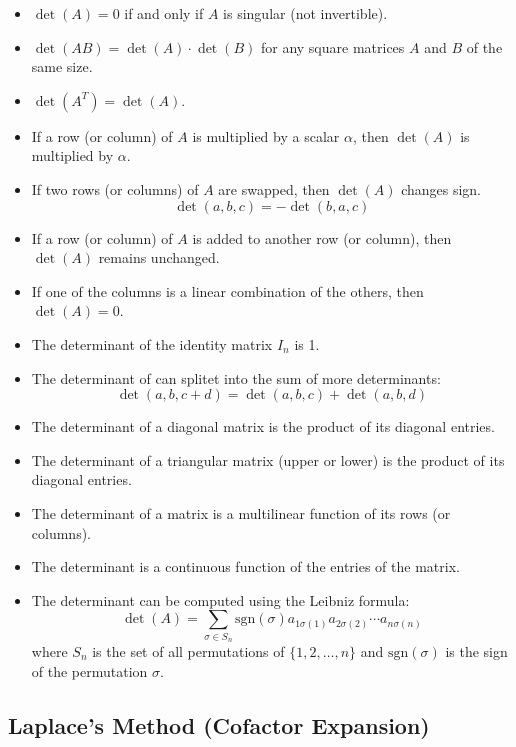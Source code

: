 \begin{itemize}[label=$-$]
    \item $\det(A) = 0$ if and only if $A$ is singular (not invertible).
    \item $\det(AB) = \det(A) \cdot \det(B)$ for any square matrices $A$ and $B$ of the same size.
    \item $\det(A^T) = \det(A)$.
    \item If a row (or column) of $A$ is multiplied by a scalar $\alpha$, then $\det(A)$ is multiplied by $\alpha$.
    \item If two rows (or columns) of $A$ are swapped, then $\det(A)$ changes sign.
    \[\det(a,b,c) = - \det(b,a,c)\]
    \item If a row (or column) of $A$ is added to another row (or column), then $\det(A)$ remains unchanged.
    \item If one of the columns is a linear combination of the others, then $\det(A) = 0$.
    \item The determinant of the identity matrix $I_n$ is 1.
    \item The determinant of can splitet into the sum of more determinants:
    \[
    \det(a,b,c + d) = \det(a,b,c) + \det(a,b,d)
    \]
    \item The determinant of a diagonal matrix is the product of its diagonal entries.
    \item The determinant of a triangular matrix (upper or lower) is the product of its diagonal entries.
    \item The determinant of a matrix is a multilinear function of its rows (or columns).
    \item The determinant is a continuous function of the entries of the matrix.
    \item The determinant can be computed using the Leibniz formula:
    \begin{equation*}
    \det(A) = \sum_{\sigma \in S_n} \text{sgn}(\sigma) a_{1\sigma(1)} a_{2\sigma(2)} \cdots a_{n\sigma(n)}
    \end{equation*}
    where $S_n$ is the set of all permutations of $\{1, 2, \ldots, n\}$ and $\text{sgn}(\sigma)$ is the sign of the permutation $\sigma$. 
\end{itemize}

\subsection*{Laplace's Method (Cofactor Expansion)}

